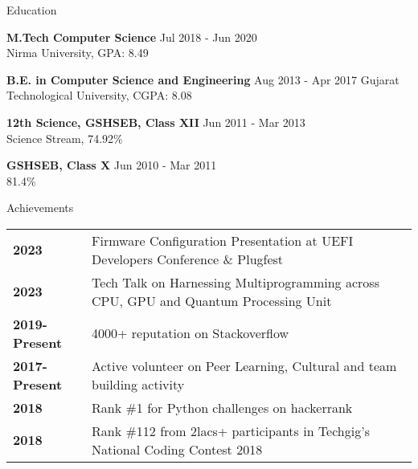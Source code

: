 \documentclass{resume} %
\begin{document}



\begin{rSection}{Education}

{\bf M.Tech Computer Science} \hfill {Jul 2018 - Jun 2020 }
\\ 
Nirma University, GPA: 8.49

{\bf B.E. in Computer Science and Engineering} \hfill {Aug 2013 - Apr 2017 }
Gujarat Technological University, CGPA: 8.08

{\textbf{12th Science, GSHSEB, Class XII}}  \hfill {Jun 2011 - Mar 2013 }\\
Science Stream, 74.92\% 
 
{\textbf{GSHSEB, Class X}}  \hfill {Jun 2010 - Mar 2011 }\\
81.4\%


\end{rSection}

\begin{rSection}{Achievements}

\begin{tabular}{ @{} >{\bfseries}l @{\hspace{6ex}} l }
2023 & Firmware Configuration Presentation at UEFI Developers Conference \& Plugfest \\
2023 & Tech Talk on Harnessing Multiprogramming across CPU, GPU and Quantum Processing Unit \\
2019-Present & 4000+ reputation on Stackoverflow \\
2017-Present & Active volunteer on Peer Learning, Cultural and team building activity \\
2018 & Rank \#1 for Python challenges on hackerrank \\
2018 & Rank \#112 from 2lacs+ participants in Techgig's National Coding Contest 2018 \\

\end{tabular}

\end{rSection}
\end{document}
